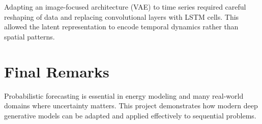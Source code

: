\documentclass{article}
\begin{document}
Adapting an image-focused architecture (VAE) to time series required careful reshaping of data and replacing convolutional layers with LSTM cells. This allowed the latent representation to encode temporal dynamics rather than spatial patterns.

\section{Final Remarks}
Probabilistic forecasting is essential in energy modeling and many real-world domains where uncertainty matters. This project demonstrates how modern deep generative models can be adapted and applied effectively to sequential problems.
\end{document}
